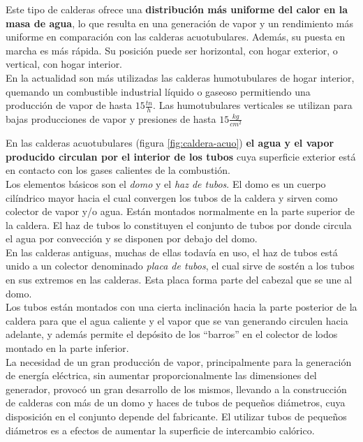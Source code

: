 Este tipo de calderas ofrece una \textbf{distribución más uniforme del calor en la masa de agua}, lo que resulta en una generación de vapor y un rendimiento más uniforme en comparación con las calderas acuotubulares. Además, su puesta en marcha es más rápida. Su posición puede ser horizontal, con hogar exterior, o vertical, con hogar interior.\\



En la actualidad son más utilizadas las calderas humotubulares de hogar interior, quemando un combustible industrial líquido o gaseoso permitiendo una producción de vapor de hasta $15\frac{tn}{h}$. Las humotubulares verticales se utilizan para bajas producciones de vapor y presiones de hasta $15\frac{kg}{cm^2}$



En las calderas acuotubulares (figura \ref{fig:caldera-acuo})  \textbf{el agua y el vapor producido circulan por el interior de los tubos} cuya superficie exterior está en contacto con los gases calientes de la combustión.\\

Los elementos básicos son el \emph{domo} y el
\emph{haz de tubos}. El domo es un cuerpo cilíndrico mayor hacia
el cual convergen los tubos de la caldera y sirven como colector de vapor y/o agua. Están montados normalmente en la parte superior de la caldera. El haz de
tubos lo constituyen el conjunto de tubos por donde circula el agua por convección y se disponen por debajo del domo.\\

En las calderas antiguas, muchas de ellas todavía en uso, el haz de tubos está unido a un colector denominado \emph{placa de tubos}, el cual sirve de sostén a los tubos en sus extremos en las calderas. Esta placa forma parte del cabezal que se une al domo.\\

Los tubos están montados con una cierta inclinación hacia la parte posterior de la caldera para que el agua caliente y el vapor que se van generando circulen hacia adelante, y además permite el depósito de los ``barros'' en el colector de lodos montado en la parte inferior.\\

La necesidad de un gran producción de vapor, principalmente para la generación de energía eléctrica, sin aumentar proporcionalmente las dimensiones del generador, provocó un gran
desarrollo de los mismos, llevando a la construcción de calderas con más de un domo y haces de tubos de pequeños diámetros, cuya disposición en el conjunto depende del fabricante. El utilizar tubos de pequeños diámetros es a efectos de aumentar la superficie de intercambio
calórico.\\


